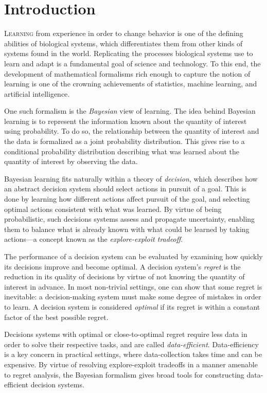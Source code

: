 \documentclass[11pt]{book}
\begin{document}
\chapter{Introduction}
\label{ch:intro}

\lettrine{L}{earning} from experience in order to change behavior is one of the defining abilities of biological systems, which differentiates them from other kinds of systems found in the world.
Replicating the processes biological systems use to learn and adapt is a fundamental goal of science and technology.
To this end, the development of mathematical formalisms rich enough to capture the notion of learning is one of the crowning achievements of statistics, machine learning, and artificial intelligence.

One such formalism is the \emph{Bayesian} view of learning.
The idea behind Bayesian learning is to represent the information known about the quantity of interest using probability.
To do so, the relationship between the quantity of interest and the data is formalized as a joint probability distribution.
This gives rise to a conditional probability distribution describing what was learned about the quantity of interest by observing the data.

Bayesian learning fits naturally within a theory of \emph{decision}, which describes how an abstract decision system should select actions in pursuit of a goal.
This is done by learning how different actions affect pursuit of the goal, and selecting optimal actions consistent with what was learned.
By virtue of being probabilistic, such decisions systems assess and propagate uncertainty, enabling them to balance what is already known with what could be learned by taking actions---a concept known as the \emph{explore-exploit tradeoff}.

The performance of a decision system can be evaluated by examining how quickly its decisions improve and become optimal.
A decision system's \emph{regret} is the reduction in its quality of decisions by virtue of not knowing the quantity of interest in advance.
In most non-trivial settings, one can show that some regret is inevitable: a decision-making system must make some degree of mistakes in order to learn.
A decision system is considered \emph{optimal} if its regret is within a constant factor of the best possible regret.

Decisions systems with optimal or close-to-optimal regret require less data in order to solve their respective tasks, and are called \emph{data-efficient}.
Data-efficiency is a key concern in practical settings, where data-collection takes time and can be expensive.
By virtue of resolving explore-exploit tradeoffs in a manner amenable to regret analysis, the Bayesian formalism gives broad tools for constructing data-efficient decision systems.
\end{document}
